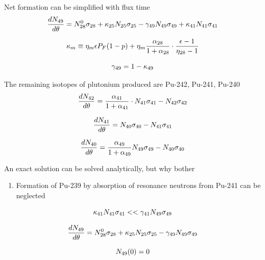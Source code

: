 \documentclass[aspectratio=1610,pdftex,dvipsnames,compress,xcolor={dvipsnames}]{beamer}
\begin{document}
\begin{frame}{Net formation can be simplified with flux time}
    \begin{equation}
        \LARGE
        \frac{dN_{49}}{d\theta}=N_{28}^0\sigma_{28} + \kappa_{25}N_{25}\sigma_{25}-\gamma_{49}N_{49}\sigma_{49} + \kappa_{41}N_{41}\sigma_{41}
    \end{equation}
    
    \begin{equation}
        \LARGE
        \kappa_m \equiv\eta_m\epsilon P_F(1-p) + \eta_m\frac{\alpha_{28}}{1 + \alpha_{28}}\cdot\frac{\epsilon-1}{\eta_{28}-1}
    \end{equation}
    
    \begin{equation}
        \LARGE
        \gamma_{49} = 1 - \kappa_{49}
    \end{equation}
\end{frame}


\begin{frame}{The remaining isotopes of plutonium produced are Pu-242, Pu-241, Pu-240}
    \begin{equation}
        \LARGE
        \frac{dN_{42}}{d\theta}=\frac{\alpha_{41}}{1 + \alpha_{41}}\cdot N_{41}\sigma_{41}-N_{42}\sigma_{42}
    \end{equation}
    
    \begin{equation}
        \LARGE
        \frac{dN_{41}}{d\theta}=N_{40}\sigma_{40}-N_{41}\sigma_{41}
    \end{equation}
    
    \begin{equation}
        \LARGE
        \frac{dN_{40}}{d\theta}=\frac{\alpha_{49}}{1 + \alpha_{49}}N_{49}\sigma_{49}-N_{40}\sigma_{40}
    \end{equation}
\end{frame}


\begin{frame}{An exact solution can be solved analytically, but why bother}
    \begin{enumerate}[series=outerlist,topsep=0pt,itemsep=7pt,leftmargin=*,label=(\arabic*)]
        \item[]Formation of Pu-239 by absorption of resonance neutrons from Pu-241 can be neglected
    \end{enumerate}

    \vspace*{\fill}

    \begin{equation}
        \LARGE
        \kappa_{41} N_{41} \sigma_{41} << \gamma_{41} N_{49} \sigma_{49}
    \end{equation}
    
    \begin{equation}
        \LARGE
        \frac{dN_{49}}{d\theta}=N_{28}^0\sigma_{28} + \kappa_{25} N_{25}\sigma_{25}-\gamma_{49} N_{49} \sigma_{49}
    \end{equation}
    
    \begin{equation}
        \LARGE
        N_{49}(0) = 0
    \end{equation}
\end{frame}
\end{document}
